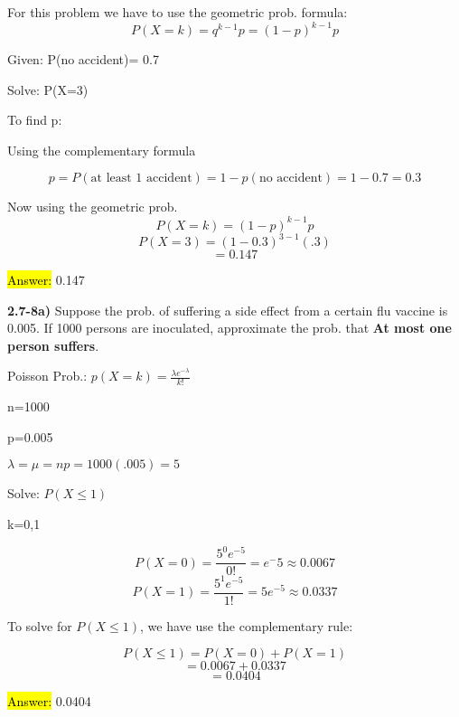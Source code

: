 \documentclass{article}
\begin{document}
For this problem we have to use the geometric prob. formula: 
$$P(X=k)=q^{k-1}p=(1-p)^{k-1}p$$

\vspace{2mm}

Given: P(no accident)= 0.7

\vspace{2mm}

Solve: P(X=3)

\vspace{2mm}

To find p:

\vspace{2mm}

Using the complementary formula

$$p=P(\text{at least 1 accident})=1-p(\text{no accident})=1-0.7=0.3$$

Now using the geometric prob.
$$P(X=k)=(1-p)^{k-1}p$$
$$P(X=3)=(1-0.3)^{3-1}(.3)$$
$$=0.147$$

\hl{Answer:} 0.147


\newpage
\textbf{2.7-8a)} Suppose the prob. of suffering a side effect from a certain flu vaccine is 0.005. If 1000 persons are inoculated, approximate the prob. that \textbf{At most one person suffers}.

\vspace{2mm}

Poisson Prob.: $p(X=k)=\frac{\lambda e^{-\lambda}}{k!}$

\vspace{2mm}

n=1000

\vspace{2mm}

p=0.005

\vspace{2mm}

$\lambda=\mu=np=1000(.005)=5$



Solve: $P(X \le 1)$

k=0,1

$$P(X=0)=\frac{5^{0}e^{-5}}{0!}=e^-{5} \approx 0.0067$$
$$P(X=1)=\frac{5^{1}e^{-5}}{1!}=5e^{-5} \approx 0.0337$$

To solve for $P(X\le1)$, we have use the complementary rule:

$$P(X\le1)=P(X=0)+P(X=1)$$
$$=0.0067+0.0337$$
$$=0.0404$$

\vspace{2mm}
\hl{Answer:} 0.0404
 
\end{document}

